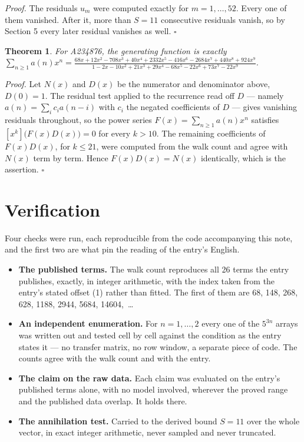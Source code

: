 \documentclass[11pt]{article}
\newtheorem{theorem}{Theorem}
\theoremstyle{definition}
\begin{document}
{\itshape Proof.} The residuals $u_m$ were computed exactly for $m = 1,\dots,52$. Every one of them vanished. After it, more than $S = 11$ consecutive residuals vanish, so by Section 5 every later residual vanishes as well. $\square$

\begin{theorem} For A234876, the generating function is exactly $\sum_{n\ge 1} a(n)x^n = \frac{68x + 12x^{2} - 708x^{3} + 40x^{4} + 2332x^{5} - 416x^{6} - 2684x^{7} + 440x^{8} + 924x^{9}}{1 - 2x - 10x^{2} + 21x^{3} + 29x^{4} - 68x^{5} - 22x^{6} + 73x^{7} - 22x^{9}}$.\end{theorem}

{\itshape Proof.} Let $N(x)$ and $D(x)$ be the numerator and denominator above, $D(0)=1$. The residual test applied to the recurrence read off $D$ --- namely $a(n) = \sum_i c_i a(n-i)$ with $c_i$ the negated coefficients of $D$ --- gives vanishing residuals throughout, so the power series $F(x)=\sum_{n\ge 1}a(n)x^n$ satisfies $[x^k]\bigl(F(x)D(x)\bigr) = 0$ for every $k > 10$. The remaining coefficients of $F(x)D(x)$, for $k \le 21$, were computed from the walk count and agree with $N(x)$ term by term. Hence $F(x)D(x) = N(x)$ identically, which is the assertion. $\square$

\section{Verification}

Four checks were run, each reproducible from the code accompanying this note, and the first two are what pin the reading of the entry's English.

\begin{itemize}

\item {\bfseries The published terms.} The walk count reproduces all 26 terms the entry publishes, exactly, in integer arithmetic, with the index taken from the entry's stated offset (1) rather than fitted. The first of them are 68, 148, 268, 628, 1188, 2944, 5684, 14604,~\dots

\item {\bfseries An independent enumeration.} For $n = 1,\dots,2$ every one of the $5^{3n}$ arrays was written out and tested cell by cell against the condition as the entry states it --- no transfer matrix, no row window, a separate piece of code. The counts agree with the walk count and with the entry.

\item {\bfseries The claim on the raw data.} Each claim was evaluated on the entry's published terms alone, with no model involved, wherever the proved range and the published data overlap. It holds there.

\item {\bfseries The annihilation test.} Carried to the derived bound $S = 11$ over the whole vector, in exact integer arithmetic, never sampled and never truncated.

\end{itemize}
\end{document}
